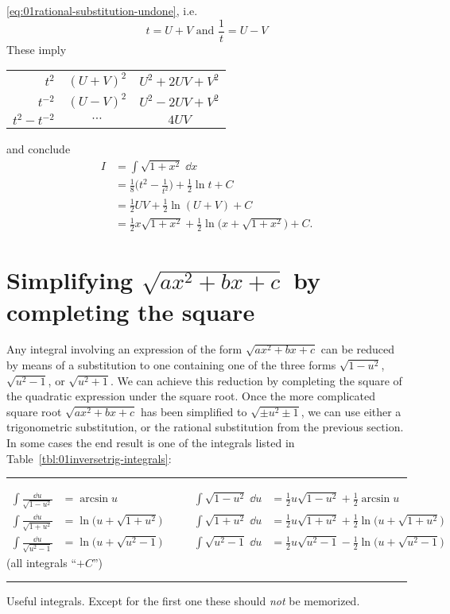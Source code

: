 \eqref{eq:01rational-substitution-undone}, i.e.
\[
t=U+V \text{ and } \frac1t = U-V
\]
These imply
\begin{center}
  \begin{tabular}{r@{$=$}c@{$=$}c}
    $t^2$&$(U+V)^2$&$U^2+2UV+V^2$\\
    $t^{-2}$ & $(U-V)^2$ & $U^2-2UV+V^2$ \\ \hline
    \rule{0pt}{12pt} $t^2-t^{-2}$ &$\cdots$ & $4UV$
  \end{tabular}
\end{center}
and conclude
\begin{align*}
  I &= \int \sqrt{1+x^2}\; \dd x   \\
  &= \frac18 \bigl(t^2 - \frac{1}{t^2}\bigr) + \frac12 \ln t +C\\
  &= \frac 12 UV + \frac12 \ln (U+V) + C    \\
  &= \frac12 x\sqrt{1+x^2} + \frac12 \ln\bigl(x+\sqrt{1+x^2}\bigr) + C.
\end{align*}



\section{Simplifying $\sqrt{ax^2+bx+c}$ by completing the square} %
\label{sec:integr-involv-sqrt}
Any integral involving an expression of the form $\sqrt{ax^2+bx+c}$ can be
reduced by means of a substitution to one containing one of the three forms
$\sqrt{1-u^2}$, $\sqrt{u^2-1}$, or $\sqrt{u^2+1}$.  We can achieve this
reduction by completing the square of the quadratic expression under the square
root.  Once the more complicated square root $\sqrt{ax^2+bx+c}$ has been
simplified to $\sqrt{\pm u^2\pm1}$, we can use either a trigonometric
substitution, or the rational substitution from the previous section.  In some
cases the end result is one of the integrals listed in
Table~\ref{tbl:01inversetrig-integrals}:

\begin{table}[h]\color{darkbluegreen}\problemfont\noindent%
  \rule{\textwidth}{1pt}
  \begin{align*}
    \int \frac{\dd u}{\sqrt{1-u^2}} & = \arcsin u &
    \int \sqrt{1-u^2}\;\dd u &= \tfrac12 u\sqrt{1-u^2} + \tfrac12 \arcsin u   \\
    \int \frac{\dd u}{\sqrt{1+u^2}} & = \ln \bigl(u+\sqrt{1+u^2}\bigr) \qquad &
    \int \sqrt{1+u^2}\;\dd u &= \tfrac12 u\sqrt{1+u^2} + \tfrac12 \ln \bigl(u+\sqrt{1+u^2}\bigr)   \\
    \int \frac{\dd u}{\sqrt{u^2-1}} & = \ln \bigl(u+\sqrt{u^2-1}\bigr) & \int
    \sqrt{u^2-1}\;\dd u &= \tfrac12 u\sqrt{u^2-1} - \tfrac12
    \ln\bigl(u+\sqrt{u^2-1}\bigr)
  \end{align*}
  (all integrals ``$+C$'')
  \rule{\textwidth}{1pt}
  \caption{Useful integrals.  Except for the first one these should \emph{not}
  be memorized.}
  \label{tbl:01inversetrig-integrals}
\end{table}

